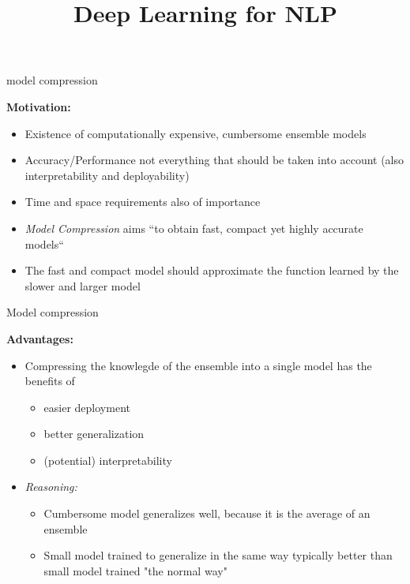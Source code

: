 \documentclass[11pt,compress,t,notes=noshow, xcolor=table]{beamer}
\title{Deep Learning for NLP}
\begin{document}


\begin{frame}{model compression}

\vfill

\textbf{Motivation:} 

\begin{itemize}
				\item Existence of computationally expensive, cumbersome ensemble models
				\item Accuracy/Performance not everything that should be taken into account (also interpretability and deployability)
				\item Time and space requirements also of importance
				\item \textit{Model Compression} aims ``to obtain fast, compact yet highly accurate models``
				\item The fast and compact model should approximate the function learned by the slower and larger model
\end{itemize}

\vfill

\end{frame}


\begin{frame}{Model compression}

\vfill

\textbf{Advantages:}

\begin{itemize}
	\item Compressing the knowlegde of the ensemble into a single model has the benefits of
			\begin{itemize}
				\item easier deployment
				\item better generalization
				\item (potential) interpretability
			\end{itemize} 
	\item \textit{Reasoning:}
		\begin{itemize}
			\item Cumbersome model generalizes well, because it is the average of an ensemble
			\item Small model trained to generalize in the same way typically better than small model trained "the normal way"
		\end{itemize}
\end{itemize}

\vfill

\end{frame}
\end{document}
